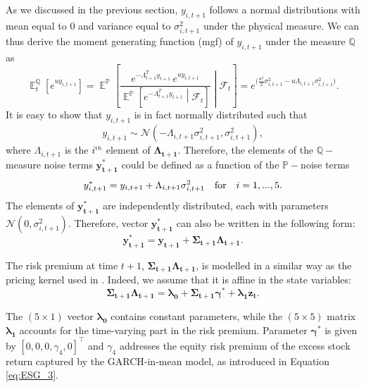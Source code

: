 \documentclass{sfuthesis}
\DeclareMathOperator{\E}{\mathbb{E}}
\numberwithin{equation}{chapter}
\begin{document}
	
		\justify
		As we discussed in the previous section, $y_{i,t+1}$ follows a normal distributions with mean equal to $0$ and variance equal to $\sigma_{i,t+1}^2$ under the physical measure. We can thus derive the moment generating function (mgf) of $y_{i,t+1}$ under the measure $\mathbb{Q}$ as
		\begin{equation}
		\label{eq:ESG_13}
		\E_{t}^{\mathbb{Q}}[e^{uy_{i,t+1}}] = \E^{\mathbb{P}}\left[\frac{e^{-\Lambda_{t+1}^{T}y_{t+1}}\,e^{uy_{i,t+1}}}{\E^{\mathbb{P}}\left[e^{-\Lambda_{t+1}^{T}y_{t+1}}\middle| \mathcal{F}_{t} \right]}\middle| \mathcal{F}_{t}\right]
		= e^{\Big(\frac{u^2}{2}\sigma_{i,t+1}^2 - u \Lambda_{i,t+1}\sigma_{i,t+1}^2\Big)}.
		\end{equation}
		\justify
		It is easy to show that $y_{i,t+1}$ is in fact normally distributed such that 
		\begin{equation}
		\label{eq:ESG_14}
		y_{i,t+1} \sim \mathcal{N}\left(-\Lambda_{i,t+1}\sigma_{i,t+1}^2, \sigma_{i,t+1}^2\right), 
		\end{equation}
		where $\Lambda_{i,t+1}$ is the $i^{\text{\tiny{th}}}$ element of $\boldsymbol{\Lambda_{t+1}}$. Therefore, the elements of the $\mathbb{Q}-$measure noise terms $\boldsymbol{y_{t+1}^*}$ could be defined as a function of the $\mathbb{P}-$noise terms
		\begin{equation}
		\label{eq:ESG_15}
		y_{i,t+1}^* = y_{i,t+1} +\Lambda_{i, t+1}\sigma^2_{i, t+1} \quad \textnormal{for} \quad i = 1,...,5.
		\end{equation}
		The elements of $\boldsymbol{y_{t+1}^{\ast}}$ are independently distributed, each with parameters $\mathcal{N}(0,\sigma_{i,t+1}^2)$. Therefore, vector $\boldsymbol{y_{t+1}^*}$ can also be written in the following form:
		\begin{equation}
		\label{eq:ESG_16}
		\boldsymbol{y_{t+1}^* = y_{t+1} + \Sigma_{t+1}\Lambda_{t+1}}.
		\end{equation}
		
	
	
		\justify
		The risk premium at time $t+1$, $\boldsymbol{\Sigma_{t+1}\Lambda_{t+1}}$, is modelled in a similar way as the pricing kernel used in \citet{Hoevenaars2008}. Indeed, we assume that it is affine in the state variables:
		\begin{equation}
		\label{eq:ESG_17}
		\boldsymbol{\Sigma_{t+1}\Lambda_{t+1} = \lambda_0 +\Sigma_{t+1}\gamma^*+ \lambda_1z_{t}}.
		\end{equation}
		
		\justify		
		The $(5 \times 1)$ vector $\boldsymbol{\lambda_0}$ contains constant parameters, while the $(5 \times 5)$ matrix $\boldsymbol{\lambda_1}$ accounts for the time-varying part in the risk premium. Parameter $\boldsymbol{\gamma^*}$ is given by $[0, 0, 0, \gamma_4, 0]^\top$ and $\gamma_4$ addresses the equity risk premium of the excess stock return captured by the GARCH-in-mean model, as introduced in Equation \eqref{eq:ESG_3}.
	
\end{document}
